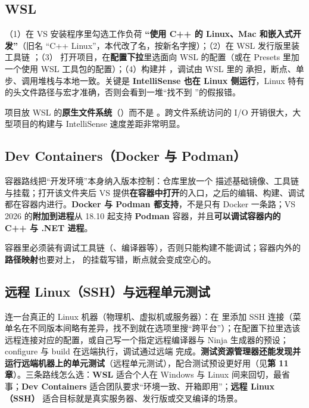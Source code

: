 \subsection{WSL}
（1）在 VS 安装程序里勾选工作负荷 \textbf{“使用 C++ 的 Linux、Mac 和嵌入式开发”}（旧名 “C++ Linux”，本代改了名，按新名字搜）；（2）在 WSL 发行版里装工具链 ；（3） 打开项目，在\textbf{配置下拉}里选面向 WSL 的配置（或在 Presets 里加一个使用 WSL 工具包的配置）；（4）构建并 ，调试由 WSL 里的  承担，断点、单步、调用堆栈与本地一致。关键是 \textbf{IntelliSense 也在 Linux 侧运行}，Linux 特有的头文件路径与宏才准确，否则会看到一堆“找不到 ”的假报错。

\begin{tipbox}[提示]
项目放 WSL 的\textbf{原生文件系统}（）而不是 。跨文件系统访问的 I/O 开销很大，大型项目的构建与 IntelliSense 速度差距非常明显。
\end{tipbox}

\subsection{Dev Containers（Docker 与 Podman）}
容器路线把“开发环境”本身纳入版本控制：仓库里放一个 \allowbreak{} 描述基础镜像、工具链与挂载；打开该文件夹后 VS 提供\textbf{在容器中打开}的入口，之后的编辑、构建、调试都在容器内进行。\textbf{Docker 与 Podman 都支持}，不是只有 Docker 一条路；VS 2026 的\textbf{附加到进程}从 18.10 起支持 \textbf{Podman} 容器，并且\textbf{可以调试容器内的 C++ 与 .NET 进程}。

\begin{warnbox}[注意]
容器里必须装有调试工具链（、编译器等），否则只能构建不能调试；容器内外的\textbf{路径映射}也要对上， 的挂载写错，断点就会变成空心的。
\end{warnbox}

\subsection{远程 Linux（SSH）与远程单元测试}
连一台真正的 Linux 机器（物理机、虚拟机或服务器）：在  里添加 SSH 连接（菜单名在不同版本间略有差异，找不到就在选项里搜“跨平台”）；在配置下拉里选该远程连接对应的配置，或自己写一个指定远程编译器与 Ninja 生成器的预设；configure 与 build 在远端执行，调试通过远端  完成。\textbf{测试资源管理器还能发现并运行远端机器上的单元测试}（远程单元测试），配合测试预设更好用（见\textbf{第 11 章}）。三条路线怎么选：\textbf{WSL} 适合个人在 Windows 与 Linux 间来回切，最省事；\textbf{Dev Containers} 适合团队要求“环境一致、开箱即用”；\textbf{远程 Linux（SSH）} 适合目标就是真实服务器、发行版或交叉编译的场景。

